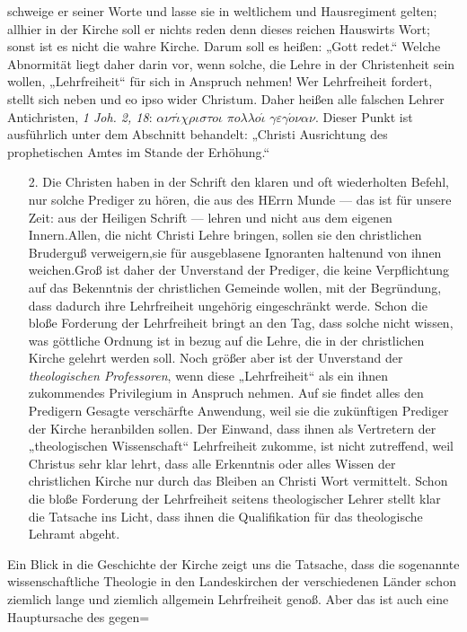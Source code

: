 schweige er seiner Worte und lasse sie in weltlichem und Hausregiment gelten; allhier in der Kirche soll er nichts reden denn dieses reichen Hauswirts Wort; sonst ist es nicht die wahre Kirche. Darum soll es heißen: „Gott redet.“ Welche Abnormität liegt daher darin vor, wenn solche, die Lehre in der Christenheit sein wollen, „Lehrfreiheit“ für sich in Anspruch nehmen! Wer Lehrfreiheit fordert, stellt sich neben und eo ipso wider Christum. Daher heißen alle falschen Lehrer Antichristen, \textit{1 Joh. 2, 18}: $\alpha\nu\tau\acute{\iota}\chi\rho\iota\sigma\tau o\iota$ $\pi o\lambda\lambda o\acute{\iota}$ $\gamma\varepsilon\gamma\acute{o}\nu\alpha\nu$. Dieser Punkt ist ausführlich unter dem Abschnitt behandelt: „Christi Ausrichtung des prophetischen Amtes im Stande der Erhöhung.“\footnotemark[532]\par\begin{enumerate}\item[2.] Die Christen haben in der Schrift den klaren und oft wiederholten Befehl, nur solche Prediger zu hören, die aus des HErrn Munde --- das ist für unsere Zeit: aus der Heiligen Schrift --- lehren und nicht aus dem eigenen Innern.\footnotemark[533] Allen, die nicht Christi Lehre bringen, sollen sie den christlichen Bruderguß verweigern,\footnotemark[534] sie für ausgeblasene Ignoranten halten\footnotemark[535] und von ihnen weichen.\footnotemark[536] Groß ist daher der Unverstand der Prediger, die keine Verpflichtung auf das Bekenntnis der christlichen Gemeinde wollen, mit der Begründung, dass dadurch ihre Lehrfreiheit ungehörig eingeschränkt werde. Schon die bloße Forderung der Lehrfreiheit bringt an den Tag, dass solche nicht wissen, was göttliche Ordnung ist in bezug auf die Lehre, die in der christlichen Kirche gelehrt werden soll. Noch größer aber ist der Unverstand der \textit{theologischen Professoren}, wenn diese „Lehrfreiheit“ als ein ihnen zukommendes Privilegium in Anspruch nehmen. Auf sie findet alles den Predigern Gesagte verschärfte Anwendung, weil sie die zukünftigen Prediger der Kirche heranbilden sollen. Der Einwand, dass ihnen als Vertretern der „theologischen Wissenschaft“ Lehrfreiheit zukomme, ist nicht zutreffend, weil Christus sehr klar lehrt, dass alle Erkenntnis oder alles Wissen der christlichen Kirche nur durch das Bleiben an Christi Wort vermittelt. Schon die bloße Forderung der Lehrfreiheit seitens theologischer Lehrer stellt klar die Tatsache ins Licht, dass ihnen die Qualifikation für das theologische Lehramt abgeht.\end{enumerate}\par Ein Blick in die Geschichte der Kirche zeigt uns die Tatsache, dass die sogenannte wissenschaftliche Theologie in den Landeskirchen der verschiedenen Länder schon ziemlich lange und ziemlich allgemein Lehrfreiheit genoß. Aber das ist auch eine Hauptursache des gegen=\par\vspace{1em}\par{\small{}\par{}\par{}\par{}\par{}\par}